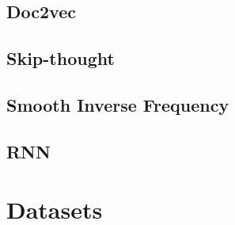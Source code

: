 \subsection{Doc2vec}
\subsection{Skip-thought}
\subsection{Smooth Inverse Frequency}
\subsection{RNN}


\section{Datasets}


